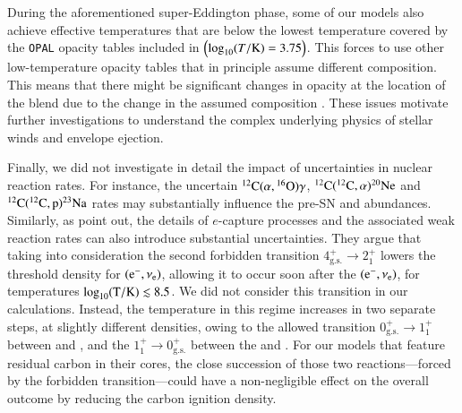 \documentclass[main.tex]{subfiles}
\begin{document}
During the aforementioned super-Eddington phase, some of our models also achieve effective temperatures 
that are below the lowest temperature covered by the \texttt{OPAL} opacity tables included in 
\mesa $\left( \log_{10} (T/\rm K) = 3.75 \right)$. This forces \mesa to use other low-temperature opacity 
tables that in principle assume different composition. This means that there might be significant 
changes in opacity at the location of the blend due to the change in the assumed composition 
\citep[see][for details]{Schwab:2019:RCrB}. These issues motivate further investigations to 
understand the complex underlying physics of stellar winds and envelope ejection. 

Finally, we did not investigate in detail the impact of uncertainties in  nuclear reaction rates. 
For instance, the uncertain  $\iso{C}{12}({\rm \alpha},\iso{O}{16})\gamma$,  $\iso{C}{12}(\iso{C}{12},{\rm \alpha})\iso{Ne}{20}$ and 
$\iso{C}{12}(\iso{C}{12},{\rm p})\iso{Na}{23}$ rates  
may substantially influence the pre-SN  and  abundances. 
Similarly, as \cite{Stromberg:nl2021} point out, the details of $e$-capture processes and the associated 
weak reaction rates can also introduce substantial uncertainties. They argue that taking into consideration the second forbidden transition $4^{+}_{\text{g.s.}} \rightarrow 2^{+}_{1}$ lowers the threshold density for $(\electron,\neutrinoe)$, allowing it 
to occur soon after the $(\electron,\neutrinoe)$, for temperatures 
$\log_{10}(\rm T / {\rm K}) \lesssim 8.5$. We did not consider this transition in our calculations. 
Instead, the temperature in this regime  increases in two separate steps, at slightly different 
densities, owing to the allowed transition $0^{+}_{\text{g.s.}} \rightarrow 1^{+}_{1}$ between 
 and , and the $1^{+}_{1} \rightarrow 0^{+}_{\text{g.s.}}$ between the 
 and . For our models that feature residual carbon in their cores, 
the close succession of those two reactions---forced by the forbidden transition---could have a 
non-negligible effect on the overall outcome by reducing the carbon ignition density.
\end{document}
